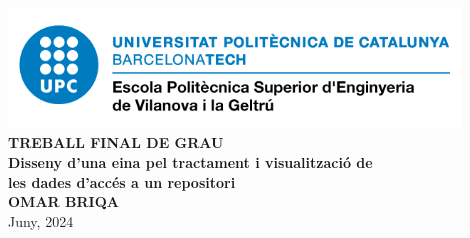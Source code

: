 \begin{titlepage-epsevg}
    \begin{center}

        \vspace*{-3cm}
        \includegraphics[width=0.9\textwidth]{figures/epsevg-logo} \\ [1cm]

        \Huge
        \textbf{TREBALL FINAL DE GRAU} \\ [2cm]

        \Huge
        \textbf{Disseny d'una eina pel tractament i visualització de \\ les dades d'accés a un repositori} \\ [2cm]

        \huge
        \textbf{OMAR BRIQA} \\ [2cm]
        Juny, 2024

    \end{center}
\end{titlepage-epsevg}
